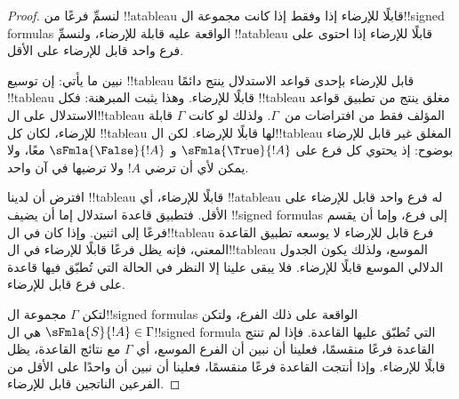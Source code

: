 \documentclass[../../../include/open-logic-section]{subfiles}
\begin{document}
\begin{proof}
لنسمِّ فرعًا من !!a{tableau} قابلًا للإرضاء إذا وفقط إذا كانت مجموعة
ال!!{signed formula}s الواقعة عليه قابلة للإرضاء، ولنسمِّ !!a{tableau}
قابلًا للإرضاء إذا احتوى على فرع واحد قابل للإرضاء على الأقل.

نبين ما يأتي: إن توسيع !!{tableau} قابل للإرضاء بإحدى قواعد الاستدلال
ينتج دائمًا !!{tableau} قابلًا للإرضاء. وهذا يثبت المبرهنة: فكل
!!{tableau} مغلق ينتج من تطبيق قواعد الاستدلال على ال!!{tableau} المؤلف
فقط من افتراضات من~$\Gamma$. ولذلك لو كانت $\Gamma$ قابلة للإرضاء، لكان
كل !!{tableau} لها قابلًا للإرضاء. لكن ال!!{tableau} المغلق غير قابل
للإرضاء بوضوح: إذ يحتوي كل فرع على $\sFmla{\True}{!A}$ و
$\sFmla{\False}{!A}$ معًا، ولا يمكن لأي  أن ترضي
$!A$ ولا ترضيها في آن واحد.

افترض أن لدينا !!{tableau} قابلًا للإرضاء، أي !!a{tableau} له فرع واحد
قابل للإرضاء على الأقل. فتطبيق قاعدة استدلال إما أن يضيف
!!{signed formula}s إلى فرع، وإما أن يقسم فرعًا إلى اثنين. وإذا كان في
ال!!{tableau} فرع قابل للإرضاء لا يوسعه تطبيق القاعدة المعني، فإنه يظل
فرعًا قابلًا للإرضاء في ال!!{tableau} الموسع، ولذلك يكون الجدول الدلالي
الموسع قابلًا للإرضاء. فلا يبقى علينا إلا النظر في الحالة التي تُطبّق فيها
قاعدة على فرع قابل للإرضاء.

لتكن $\Gamma$ مجموعة ال!!{signed formula}s الواقعة على ذلك الفرع،
ولتكن $\sFmla{S}{!A} \in \Gamma$ هي ال!!{signed formula} التي تُطبّق
عليها القاعدة. فإذا لم تنتج القاعدة فرعًا منقسمًا، فعلينا أن نبين أن الفرع
الموسع، أي $\Gamma$ مع نتائج القاعدة، يظل قابلًا للإرضاء. وإذا أنتجت القاعدة
فرعًا منقسمًا، فعلينا أن نبين أن واحدًا على الأقل من الفرعين الناتجين قابل
للإرضاء.
  

\end{proof}
\end{document}
